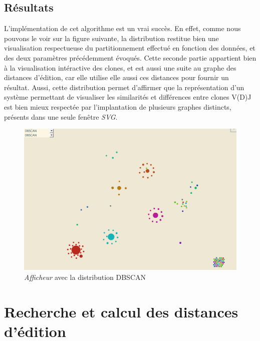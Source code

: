 \documentclass[pdftex,12pt,a4paper]{report}
\begin{document}
\begin{spacing}{1.2}
\section{Résultats}

L'implémentation de cet algorithme est un vrai succès. En effet, comme nous pouvons le voir sur la figure suivante, la distribution restitue bien une visualisation respectueuse du partitionnement effectué en fonction des données, et des deux paramètres précédemment évoqués.
Cette seconde partie appartient bien à la visualisation intéractive des clones, et est aussi une suite au graphe des distances d'édition, car elle utilise elle aussi ces distances pour fournir un résultat.
Aussi, cette distribution permet d'affirmer que la représentation d'un système permettant de visualiser les similarités et différences entre clones V(D)J est bien mieux respectée par l'implantation de plusieurs graphes distincts, présents dans une seule fenêtre \textit{SVG}.

\begin{figure}[h!]
\begin{center}
	\includegraphics[scale=0.57]{img/DBSCAN-Ex.jpg}
\end{center}
\caption{\textit{Afficheur} avec la distribution DBSCAN}
\end{figure}

\chapter{Recherche et calcul des distances d'édition}


\end{spacing}
\end{document}

